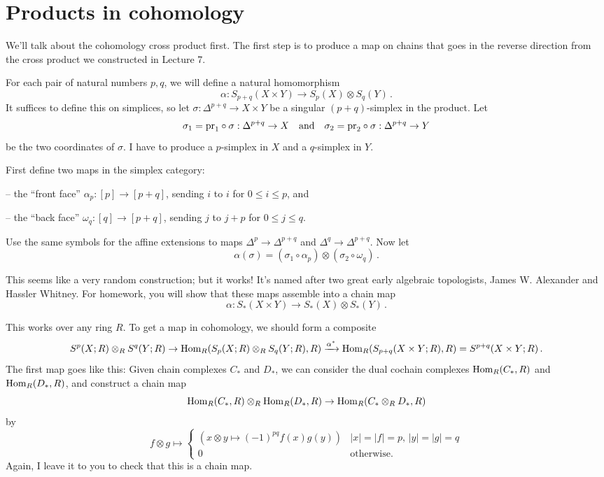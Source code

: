 \section{Products in cohomology}

We'll talk about the cohomology cross product first. The first
step is to produce a map on chains that goes in the reverse direction from
the cross product we constructed in Lecture 7. 

\begin{construction}
For each pair of natural numbers $p,q$, we will define a natural homomorphism 
\[
\alpha: S_{p+q}(X\times Y)\to S_p(X)\otimes S_q(Y)\,.
\]
It suffices to define this on simplices, so let 
$\sigma:\Delta^{p+q}\to X\times Y$ be a singular $(p+q)$-simplex in the product. Let 
\[
\sigma_1=\mathrm{pr}_1\circ\sigma:\Delta^{p+q}\to X\quad\hbox{and}\quad 
\sigma_2=\mathrm{pr}_2\circ\sigma:\Delta^{p+q}\to Y
\] 
be the two coordinates of $\sigma$. I have to produce
a $p$-simplex in $X$ and a $q$-simplex in $Y$.
 
First define two maps in the simplex category: 

\smallskip
-- the ``front face''  $\alpha_p:[p]\to[p+q]$, sending $i$ to $i$ for $0\leq i\leq p$, and

\smallskip
-- the ``back face'' $\omega_q:[q]\to[p+q]$, sending $j$ to $j+p$ for $0\leq j\leq q$. 

\smallskip\noindent
Use the same symbols for the affine 
extensions to maps $\Delta^p\to \Delta^{p+q}$ and $\Delta^q\to\Delta^{p+q}$. 
Now let 
\[
\alpha(\sigma)=(\sigma_1\circ\alpha_p)\otimes(\sigma_2\circ\omega_q)\,.
\]
\end{construction}
This seems like a very random construction; but it works! It's named after two
great early algebraic topologists, James W. Alexander and Hassler Whitney.
For homework, you will show that these maps assemble into a chain map
\[
\alpha:S_\ast(X\times Y)\to S_\ast(X)\otimes S_\ast(Y)\,.
\]

This works over any ring $R$. To get a map in cohomology, we should form
a composite 
\[
S^p(X;R)\otimes_RS^q(Y;R)\to
\operatorname{Hom}_R(S_p(X;R)\otimes_RS_q(Y;R),R)\xrightarrow{\alpha^*}
\operatorname{Hom}_R(S_{p+q}(X\times Y;R),R)=S^{p+q}(X\times Y;R)\,.
\]
The first map goes like this: Given chain complexes $C_\ast$ and $D_\ast$, 
we can consider the dual cochain complexes $\operatorname{Hom}_R(C_\ast,R)$ and
$\operatorname{Hom}_R(D_\ast,R)$, and construct a chain map 
\[
\operatorname{Hom}_R(C_\ast,R)\otimes_R\operatorname{Hom}_R(D_\ast,R)\to\operatorname{Hom}_R(C_\ast\otimes_R D_\ast,R)
\]
by 
\begin{equation*}
f\otimes g\mapsto\begin{cases}
(x\otimes y\mapsto (-1)^{pq}f(x)g(y)) & |x|=|f|=p,\, |y|=|g|=q\\
0 & \text{otherwise}.
\end{cases}
\end{equation*}
Again, I leave it to you to check that this is a chain map. 

